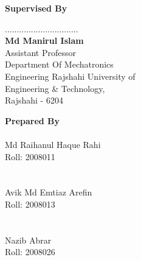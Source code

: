 \singlespacing
\begin{center}
    \begin{multicols}{2}
        \noindent \textbf{Supervised By}


        \noindent ...............................\\
        \textbf{Md Manirul Islam}\\
        Assistant Professor\\
        \noindent Department Of Mechatronics\\
        Engineering
        \noindent Rajshahi University of\\
        Engineering \& Technology,\\
        Rajshahi - 6204

        \columnbreak

        \noindent \textbf{Prepared By}
        \noindent \makebox[6cm]{}\\
        \noindent \makebox[6cm]{\dotfill}\\
        Md Raihanul Haque Rahi\\
        Roll: 2008011\\
        \noindent \makebox[6cm]{}\\
        \noindent \makebox[6cm]{\dotfill}\\

        Avik Md Emtiaz Arefin\\
        Roll: 2008013\\

        \noindent \makebox[6cm]{}\\
        \noindent \makebox[6cm]{\dotfill}\\
        Nazib Abrar\\
        Roll: 2008026\\

    \end{multicols}
\end{center}
\doublespacing
